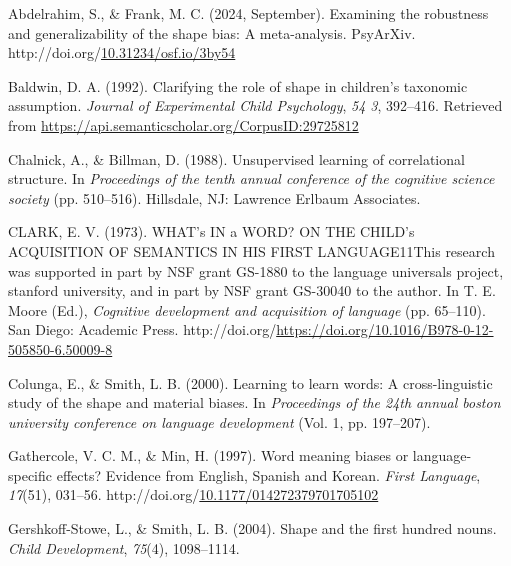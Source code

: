 \documentclass[10pt, letterpaper]{article}
\newenvironment{CSLReferences}%
  {}%
  {\par}
\begin{document}
\hypertarget{refs}{}
\begin{CSLReferences}{1}{0}
\leavevmode{}%
Abdelrahim, S., \& Frank, M. C. (2024, September). Examining the
robustness and generalizability of the shape bias: A meta-analysis.
PsyArXiv.
http://doi.org/\href{https://doi.org/10.31234/osf.io/3by54}{10.31234/osf.io/3by54}

\leavevmode{}%
Baldwin, D. A. (1992). Clarifying the role of shape in children's
taxonomic assumption. \emph{Journal of Experimental Child Psychology},
\emph{54 3}, 392--416. Retrieved from
\url{https://api.semanticscholar.org/CorpusID:29725812}

\leavevmode{}%
Chalnick, A., \& Billman, D. (1988). Unsupervised learning of
correlational structure. In \emph{Proceedings of the tenth annual
conference of the cognitive science society} (pp. 510--516). Hillsdale,
NJ: Lawrence Erlbaum Associates.

\leavevmode{}%
CLARK, E. V. (1973). WHAT's IN a WORD? ON THE CHILD's ACQUISITION OF
SEMANTICS IN HIS FIRST LANGUAGE11This research was supported in part by
NSF grant GS-1880 to the language universals project, stanford
university, and in part by NSF grant GS-30040 to the author. In T. E.
Moore (Ed.), \emph{Cognitive development and acquisition of language}
(pp. 65--110). San Diego: Academic Press.
http://doi.org/\url{https://doi.org/10.1016/B978-0-12-505850-6.50009-8}

\leavevmode{}%
Colunga, E., \& Smith, L. B. (2000). Learning to learn words: A
cross-linguistic study of the shape and material biases. In
\emph{Proceedings of the 24th annual boston university conference on
language development} (Vol. 1, pp. 197--207).

\leavevmode{}%
Gathercole, V. C. M., \& Min, H. (1997). Word meaning biases or
language-specific effects? {Evidence} from {English}, {Spanish} and
{Korean}. \emph{First Language}, \emph{17}(51), 031--56.
http://doi.org/\href{https://doi.org/10.1177/014272379701705102}{10.1177/014272379701705102}

\leavevmode{}%
Gershkoff-Stowe, L., \& Smith, L. B. (2004). Shape and the first hundred
nouns. \emph{Child Development}, \emph{75}(4), 1098--1114.


\end{CSLReferences}
\end{document}
